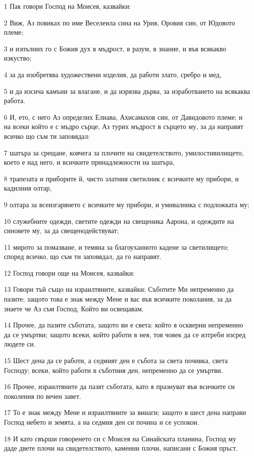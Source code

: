 \par 1 Пак говори Господ на Моисея, казвайки:
\par 2 Виж, Аз повиках по име Веселеила сина на Урия, Оровия син, от Юдовото племе;
\par 3 и изпълних го с Божия дух в мъдрост, в разум, в знание, и във всякакво изкуство;
\par 4 за да изобретява художествени изделия, да работи злато, сребро и мед,
\par 5 и да изсича камъни за влагане, и да изрязва дърва, за изработването на всякаква работа.
\par 6 И, ето, с него Аз определих Елиава, Ахисамахов син, от Давидовото племе; и на всеки който е с мъдро сърце, Аз турих мъдрост в сърцето му, за да направят всичко що съм ти заповядал:
\par 7 шатъра за срещане, ковчега за плочите на свидетелството, умилостивилището, което е над него, и всичките принадлежности на шатъра,
\par 8 трапезата и приборите й, чисто златния светилник с всичките му прибори, и кадилния олтар,
\par 9 олтара за всеизгарянето с всичките му прибори, и умивалника с подложката му;
\par 10 служебните одежди, светите одежди на свещеника Аарона, и одеждите на синовете му, за да свещенодействуват;
\par 11 мирото за помазване, и темяна за благоуханното кадене за светилището; според всичко, що съм ти заповядал, да го направят.
\par 12 Господ говори още на Моисея, казвайки:
\par 13 Говори тъй също на израилтяните, казвайки: Съботите Ми непременно да пазите; защото това е знак между Мене и вас във всичките поколания, за да знаете че Аз съм Господ, Който ви освещавам.
\par 14 Прочее, да пазите съботата, защото ви е света: който я оскверни непременно да се умъртви; защото всеки, който работи в нея, тоя човек да се изтреби изсред людете си.
\par 15 Шест дена да се работи, а седмият ден е събота за света почивка, света Господу; всеки, който работи в съботния ден, непременно да се умъртви.
\par 16 Прочее, израилтяните да пазят съботата, като я празнуват във всичките си поколения по вечен завет.
\par 17 То е знак между Мене и израилтяните за винаги; защото в шест дена направи Господ небето и земята, а на седмия ден си почина и се успокои.
\par 18 И като свърши говоренето си с Моисея на Синайската планина, Господ му даде двете плочи на свидетелството, каменни плочи, написани с Божия пръст.

